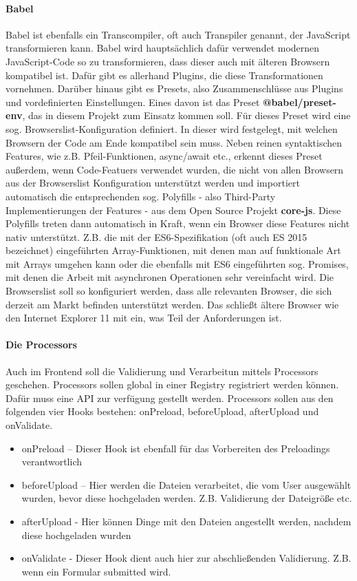 \paragraph{Babel} Babel ist ebenfalls ein Transcompiler, oft auch Transpiler genannt, der JavaScript transformieren kann. Babel wird hauptsächlich dafür verwendet modernen JavaScript-Code so zu transformieren, dass dieser auch mit älteren Browsern kompatibel ist. Dafür gibt es allerhand Plugins, die diese Transformationen vornehmen. Darüber hinaus gibt es Presets, also Zusammenschlüsse aus Plugins und vordefinierten Einstellungen. Eines davon ist das Preset \textbf{@babel/preset-env}, das in diesem Projekt zum Einsatz kommen soll. Für dieses Preset wird eine sog. Browserslist-Konfiguration definiert. In dieser wird festgelegt, mit welchen Browsern der Code am Ende kompatibel sein muss. Neben reinen syntaktischen Features, wie z.B. Pfeil-Funktionen, async/await etc., erkennt dieses Preset außerdem, wenn Code-Featuers verwendet wurden, die nicht von allen Browsern aus der Browserslist Konfiguration unterstützt werden und importiert automatisch die entsprechenden sog. Polyfills - also Third-Party Implementierungen der Features - aus dem Open Source Projekt \textbf{core-js}. Diese Polyfills treten dann automatisch in Kraft, wenn ein Browser diese Features nicht nativ unterstützt. Z.B. die mit der ES6-Spezifikation (oft auch ES 2015 bezeichnet) eingeführten Array-Funktionen, mit denen man auf funktionale Art mit Arrays umgehen kann oder die ebenfalls mit ES6 eingeführten sog. Promises, mit denen die Arbeit mit asynchronen Operationen sehr vereinfacht wird. Die Browserslist soll so konfiguriert werden, dass alle relevanten Browser, die sich derzeit am Markt befinden unterstützt werden. Das schließt ältere Browser wie den Internet Explorer 11 mit ein, was Teil der Anforderungen ist. 

\paragraph{Die Processors} Auch im Frontend soll die Validierung und Verarbeitun mittels Processors geschehen. Processors sollen global in einer Registry registriert werden können. Dafür muss eine API zur verfügung gestellt werden. Processors sollen aus den folgenden vier Hooks bestehen: onPreload, beforeUpload, afterUpload und onValidate.

\begin{itemize}
	\item onPreload 	– Dieser Hook ist ebenfall für das Vorbereiten des Preloadings verantwortlich
	\item beforeUpload 	– Hier werden die Dateien verarbeitet, die vom User ausgewählt wurden, bevor diese hochgeladen werden. Z.B. Validierung der Dateigröße etc.
	\item afterUpload 	- Hier können Dinge mit den Dateien angestellt werden, nachdem diese hochgeladen wurden
	\item onValidate	- Dieser Hook dient auch hier zur abschließenden Validierung. Z.B. wenn ein Formular submitted wird.
\end{itemize}

